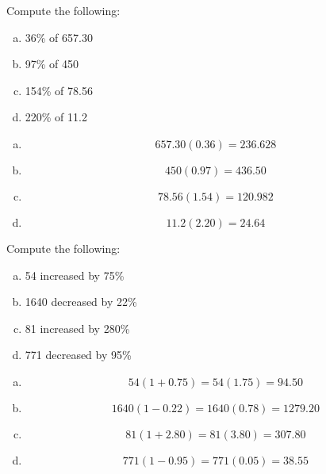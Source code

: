 \documentclass[11pt,letterpaper]{article}
\begin{document}

 Compute the following:
        \begin{enumerate}[(a)]
        \item 36\% of 657.30
        \item 97\% of 450
        \item 154\% of 78.56
        \item 220\% of 11.2
        \end{enumerate} \pspace

\sol
\begin{enumerate}[(a)]
\item 
	\[
	657.30(0.36)= 236.628
	\] \pspace

\item 
	\[
	450(0.97)= 436.50
	\] \pspace

\item 
	\[
	78.56(1.54)= 120.982
	\] \pspace

\item 
	\[
	11.2(2.20)= 24.64
	\]
\end{enumerate}



\newpage



 Compute the following:
        \begin{enumerate}[(a)]
        \item 54 increased by 75\%
        \item 1640 decreased by 22\%
        \item 81 increased by 280\%
        \item 771 decreased by 95\%
        \end{enumerate} \pspace

\sol
\begin{enumerate}[(a)]
\item 
	\[
	54(1 + 0.75)= 54(1.75)= 94.50
	\] \pspace

\item 
	\[
	1640(1 - 0.22)= 1640(0.78)= 1279.20 
	\] \pspace

\item 
	\[
	81(1 + 2.80)= 81(3.80)= 307.80
	\] \pspace

\item 
	\[
	771(1 - 0.95)= 771(0.05)= 38.55
	\]
\end{enumerate}
\end{document}
